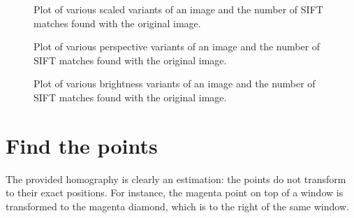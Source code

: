 \documentclass[a4paper,10pt,twoside]{article}
\begin{document}
\begin{figure}
  \begin{center}
  \end{center}
  \caption{Plot of various scaled variants of an image and the number of SIFT matches found with the original image.}
  \label{fig:scale}
\end{figure}

\begin{figure}
  \begin{center}
  \end{center}
  \caption{Plot of various perspective variants of an image and the number of SIFT matches found with the original image.}
  \label{fig:perspective}
\end{figure}

\begin{figure}
  \begin{center}
  \end{center}
  \caption{Plot of various brightness variants of an image and the number of SIFT matches found with the original image.}
  \label{fig:brightness}
\end{figure}

\section{Find the points}
The provided homography is clearly an estimation: the points do not transform to their exact positions.  For instance, the magenta point on top of a window is transformed to the magenta diamond, which is to the right of the same window.
\end{document}
